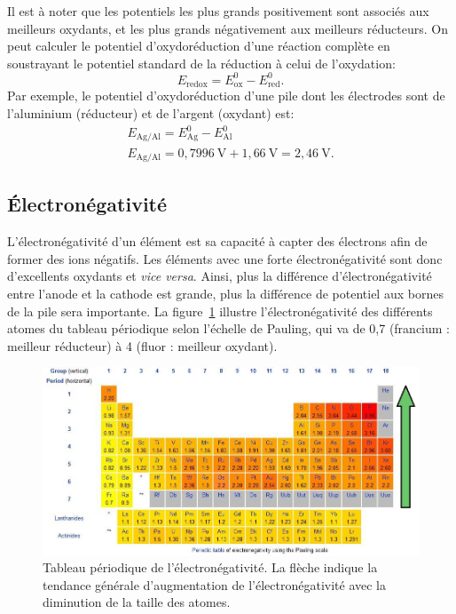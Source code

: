 \documentclass[12pt,oneside,letterpaper]{article}
\begin{document}
Il est à noter que les potentiels les plus grands positivement sont associés aux meilleurs oxydants, et les plus grands négativement aux meilleurs réducteurs. On peut calculer le potentiel d'oxydoréduction d'une réaction complète en soustrayant le potentiel standard de la réduction à celui de l'oxydation:
\begin{equation}
E_{\mathrm{redox}}=E^0_{\mathrm{ox}}-E^0_{\mathrm{red}}.
\end{equation}
Par exemple, le potentiel d'oxydoréduction d'une pile dont les électrodes sont de l'aluminium (réducteur) et de l'argent (oxydant) est:
\begin{gather*}
E_{\mathrm{Ag/Al}}=E^0_{\mathrm{Ag}}-E^0_{\mathrm{Al}}\\
E_{\mathrm{Ag/Al}}=0,\!7996~\mathrm{V}+1,\!66~\mathrm{V}=2,\!46~\mathrm{V}.
\end{gather*}


\subsection{Électronégativité}

L'électronégativité d'un élément est sa capacité à capter des électrons afin de former des ions négatifs. Les éléments avec une forte électronégativité sont donc d'excellents oxydants et \textit{vice versa}. Ainsi, plus la différence d'électronégativité entre l'anode et la cathode est grande, plus la différence de potentiel aux bornes de la pile sera importante. La figure~\ref{Pauling} illustre l'électronégativité des différents atomes du tableau périodique selon l'échelle de Pauling, qui va de 0,7 (francium : meilleur réducteur) à 4 (fluor : meilleur oxydant).

\begin{figure}[h]
\includegraphics[width=\textwidth]{pauling-scale}
\caption{\label{Pauling}Tableau périodique de l'électronégativité. La flèche indique la tendance générale d'augmentation de l'électronégativité avec la diminution de la taille des atomes.}
\end{figure}
\end{document}
